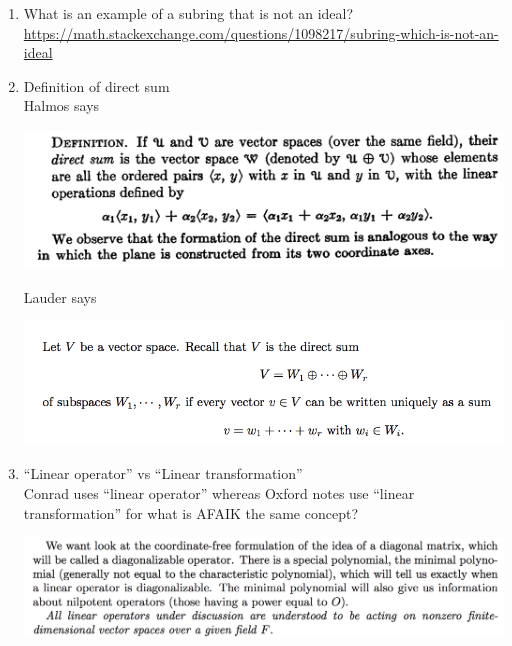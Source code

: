 \documentclass[12pt]{article}
\begin{document}
\begin{enumerate}
\begin{mdframed}
  \end{mdframed}
\item What is an example of a subring that is not an ideal?\\
  \url{https://math.stackexchange.com/questions/1098217/subring-which-is-not-an-ideal}
\item Definition of direct sum\\
  Halmos says
  \begin{mdframed}
    \includegraphics[width=400pt]{img/questions-linear-algebra-a0-direct-sum-halmos.png}
  \end{mdframed}
  Lauder says
  \begin{mdframed}
    \includegraphics[width=400pt]{img/questions-linear-algebra-a0-direct-sum-lauder.png}
  \end{mdframed}
\item ``Linear operator'' vs ``Linear transformation''\\
  Conrad uses ``linear operator'' whereas Oxford notes use ``linear transformation'' for what is
  AFAIK the same concept?
  \begin{mdframed}
    \includegraphics[width=400pt]{img/questions-linear-algebra-a0-operator-halmos.png}
  \end{mdframed}
\end{enumerate}
\end{document}

